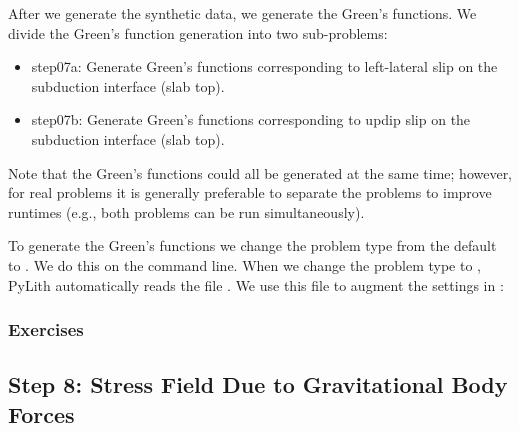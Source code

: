 After we generate the synthetic data, we generate the Green's
functions. We divide the Green's function generation into two sub-problems:
\begin{itemize}
 \item step07a:  Generate Green's functions corresponding to
   left-lateral slip on the subduction interface (slab top).
 \item step07b:  Generate Green's functions corresponding to
   updip slip on the subduction interface (slab top).
\end{itemize}
Note that the Green's functions could all be generated at the same
time; however, for real problems it is generally preferable to
separate the problems to improve runtimes (e.g., both problems can be
run simultaneously).

To generate the Green's functions we change the problem type from the
default  to . We do this
on the command line. When we change the problem type to
, PyLith automatically reads the file
. We use this file to augment the settings in
:








\subsubsection{Exercises}


\subsection{Step 8: Stress Field Due to Gravitational Body Forces}


